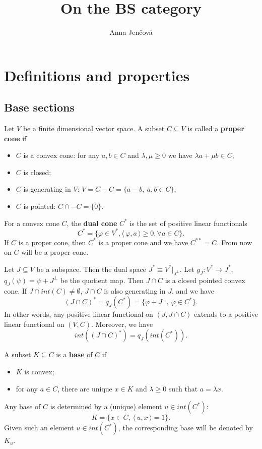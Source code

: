 \documentclass[12pt]{article}
\title{On the BS category}
\author{Anna Jen\v cov\'a}
\theoremstyle{definition}
\theoremstyle{remark}
\def\<{\langle\,}
\def\>{\,\rangle}
\begin{document}
\maketitle

\section{Definitions and properties}

\subsection{Base sections}

Let  $V$ be  a finite dimensional vector space. A subset $C\subseteq V$ is called a
\textbf{proper
cone} if 
\begin{itemize}
\item $C$ is a convex cone: for any $a,b\in C$ and $\lambda,\mu\ge 0$ we have $\lambda
a+\mu b\in C$;
\item $C$ is closed;
\item $C$ is generating in $V$: $V=C-C=\{a-b,\ a,b\in C\}$;
\item $C$ is pointed: $C\cap -C=\{0\}$. 

\end{itemize}

\medskip
\noindent
For a convex cone $C$, the \textbf{dual cone} $C^*$ is the set of positive linear
functionals 
\[
C^*=\{\varphi\in V^*,
\<\varphi,a\>\ge 0,\forall a\in C\}.
\]
If $C$ is a proper cone, then $C^*$ is a proper cone and we have $C^{**}=C$. 
From now on $C$ will be a proper cone.

\medskip
\noindent
Let $J\subseteq V$ be a subspace. Then the dual space $J^*\equiv V^*|_{J^\perp}$. Let
$g_J: V^*\to J^*$, $q_J(\psi)=\psi+J^\perp$ be the quotient map.  Then $J\cap C$ is a closed pointed convex cone. If
$J\cap int(C)\ne \emptyset$, $J\cap C$ is also generating in $J$, and we have
\[
(J\cap C)^*=q_J(C^*)=\{\varphi+J^\perp,\ \varphi\in C^*\}.
\]
In other words, any positive linear functional on $(J,J\cap C)$ extends to a positive
linear functional on $(V,C)$. Moreover, we have
\[
int((J\cap C)^*)=q_J(int(C^*)).
\]

\medskip
\noindent
A subset $K\subseteq C$ is a \textbf{base} of $C$ if 
\begin{itemize}
\item $K$ is convex;
\item for any $a\in C$, there are unique $x\in K$ and $\lambda\ge 0$ such that $a=\lambda
x$.

\end{itemize}
Any base of $C$ is determined by a (unique) element $u\in int(C^*)$: 
\[
K=\{x\in C,\ \<u,x\>=1\}.
\]
Given such an element $u\in int(C^*)$, the corresponding base will be denoted by $K_u$.
\end{document}
